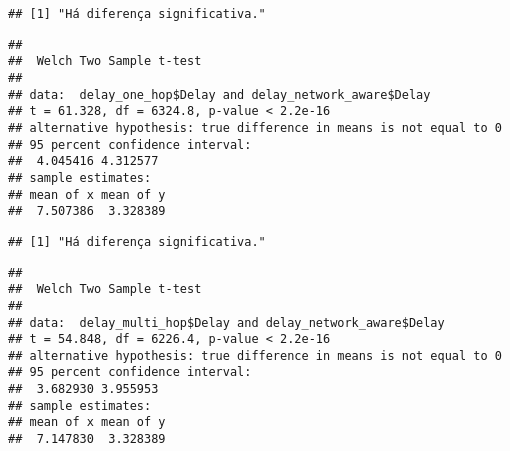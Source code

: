 \documentclass[
]{article}
\begin{document}
\begin{verbatim}
## [1] "Há diferença significativa."
\end{verbatim}

\begin{verbatim}
## 
##  Welch Two Sample t-test
## 
## data:  delay_one_hop$Delay and delay_network_aware$Delay
## t = 61.328, df = 6324.8, p-value < 2.2e-16
## alternative hypothesis: true difference in means is not equal to 0
## 95 percent confidence interval:
##  4.045416 4.312577
## sample estimates:
## mean of x mean of y 
##  7.507386  3.328389
\end{verbatim}

\begin{verbatim}
## [1] "Há diferença significativa."
\end{verbatim}

\begin{verbatim}
## 
##  Welch Two Sample t-test
## 
## data:  delay_multi_hop$Delay and delay_network_aware$Delay
## t = 54.848, df = 6226.4, p-value < 2.2e-16
## alternative hypothesis: true difference in means is not equal to 0
## 95 percent confidence interval:
##  3.682930 3.955953
## sample estimates:
## mean of x mean of y 
##  7.147830  3.328389
\end{verbatim}
\end{document}
